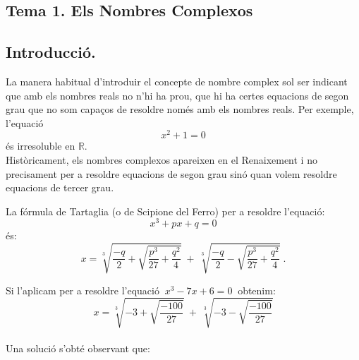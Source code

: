 \documentclass[12pt]{article}
\newcommand{\R}{\mathbb{R}}
\begin{document}
%
%
%
%
%

\pagestyle{fancy}
\fancyhead{}


\begin{center}
\section{Tema 1. Els Nombres Complexos}
\end{center}

\parskip =0.3cm
\parindent =0cm
\itemindent=2cm

\subsection{Introducci{\'o}.}

La manera habitual d'introduir el concepte de nombre complex sol ser
indicant que amb els nombres reals no n'hi ha prou, que hi ha certes
equacions de segon grau que no som capa\c{c}os de resoldre nom{\'e}s amb els
nombres reals. Per exemple, l'equaci{\'o}
$$x^{2}+1=0$$
\'{e}s irresoluble en $\R$.\\

Hist{\`o}ricament, els nombres complexos apareixen en el Renaixement i
no precisament per a resoldre equacions de segon grau sin\'{o} quan
volem resoldre equacions de tercer grau.

La f{\'o}rmula de Tartaglia (o de Scipione del Ferro) per a
resoldre l'equaci{\'o}:
$$x^{3}+px+q=0$$
\'{e}s:
$$x=\sqrt[3]{\frac{-q}{2}+\sqrt{\frac{p^{3}}{27}+\frac{q^2}{4}}}
\ +\ \sqrt[3]{\frac{-q}{2}-\sqrt{\frac{p^{3}}{27}+\frac{q^2}{4}}}\
.$$

Si l'aplicam per a resoldre l'equaci{\'o} $\ x^{3}-7x+6=0\ $
obtenim:\\

$$x=\sqrt[3]{-3+\sqrt{\frac{-100}{27}}}\ +\ \sqrt[3]{-3-\sqrt{\frac{-100}{27}}}$$\\

Una soluci{\'o} s'obt\'{e} observant que:
\end{document}
